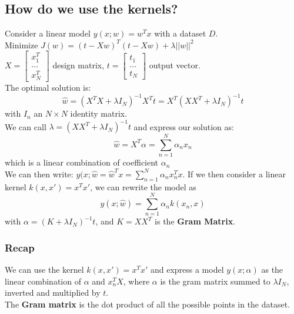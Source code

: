 \subsection{How do we use the kernels?}
Consider a linear model $y(x; w) = w^{T}x$ with a dataset $D$. \\
Minimize $J(w) = (t - Xw)^{T}(t - Xw) + \lambda ||w||^{2}$\\
$X = \begin{bmatrix} x_{1}^{T} \\ \dots \\ x_{N}^{T} \end{bmatrix}$ design matrix, $t = \begin{bmatrix} t_{1} \\ \dots \\ t_{N} \end{bmatrix}$ output vector.\\
The optimal solution is:
\begin{equation}
    \hat{w} = (X^{T}X + \lambda I_{N})^{-1}X^{T}t = X^{T}(XX^{T} + \lambda I_{N})^{-1} t
\end{equation}
with $I_{n}$ an $N \times N$ identity matrix.\\
We can call $\lambda = (XX^{T} + \lambda I_{N})^{-1} t$ and express our solution as:
\begin{equation}
    \hat{w} = X^{T}\alpha = \sum_{n=1}^{N} \alpha_{n}x_{n}
\end{equation}
which is a linear combination of coefficient $\alpha_{n}$\\
We can then write: $y(x; \hat{w} = \hat{w}^{T}x = \sum_{n=1}^{N} \alpha_{n} x_{n}^{T} x$. If we then consider a linear kernel $k(x, x') = x^{T}x'$, we can rewrite the model as
\begin{equation}
    y(x;\hat{w}) = \sum_{n=1}^{N} \alpha_{n} k(x_{n}, x)
\end{equation}
with $\alpha = (K + \lambda I_{N})^{-1}t$, and $K = XX^{T}$ is the \textbf{Gram Matrix}.

\subsubsection{Recap}
We can use the kernel $k(x,x') = x^{T}x'$ and express a model $y(x; \alpha)$ as the linear combination of $\alpha$ and $x_{n}^{T}X$, where $\alpha$ is the gram matrix summed to $\lambda I_{N}$, inverted and multiplied by $t$.\\
The \textbf{Gram matrix} is the dot product of all the possible points in the dataset.

